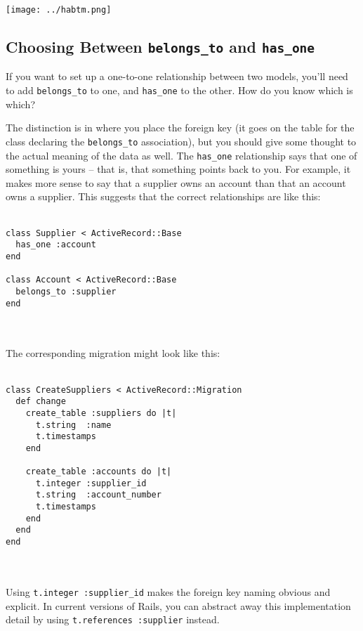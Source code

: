 \documentclass[10pt]{book}
\begin{document}
\texttt{[image: ../habtm.png]}

\subsection{ Choosing Between \texttt{belongs\_to} and \texttt{has\_one}}

If you want to set up a one-to-one relationship between two models, you’ll need to add \texttt{belongs\_to} to one, and \texttt{has\_one} to the other. How do you know which is which?

The distinction is in where you place the foreign key (it goes on the table for the class declaring the \texttt{belongs\_to} association), but you should give some thought to the actual meaning of the data as well. The \texttt{has\_one}  relationship says that one of something is yours – that is, that  something points back to you. For example, it makes more sense to say  that a supplier owns an account than that an account owns a supplier.  This suggests that the correct relationships are like this:
\\ \\
\begin{minipage}{\textwidth}{\scriptsize
\begin{verbatim}
class Supplier < ActiveRecord::Base
  has_one :account
end
 
class Account < ActiveRecord::Base
  belongs_to :supplier
end
\end{verbatim}}
\end{minipage}
\\ \\

The corresponding migration might look like this:
\\ \\
\begin{minipage}{\textwidth}{\scriptsize
\begin{verbatim}
class CreateSuppliers < ActiveRecord::Migration
  def change
    create_table :suppliers do |t|
      t.string  :name
      t.timestamps
    end
 
    create_table :accounts do |t|
      t.integer :supplier_id
      t.string  :account_number
      t.timestamps
    end
  end
end
\end{verbatim}}
\end{minipage}
\\ \\

Using \texttt{t.integer :supplier\_id} makes the  foreign key naming obvious and explicit. In current versions of Rails,  you can abstract away this implementation detail by using \texttt{t.references :supplier} instead.
\end{document}
